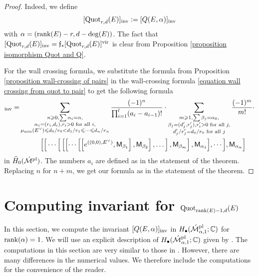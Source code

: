 \documentclass[11pt]{amsart}
\theoremstyle{remark}
\newcommand{\mf}[1]{\mathfrak{#1}}
\newcommand{\mb}[1]{\mathbb{#1}}
\newcommand{\Mdash}{\acute{\mathcal{M}}}
\newcommand{\rk}{\textnormal{rank}}
\newcommand{\wh}[1]{\widehat{#1}}
\newcommand{\quot}[0]{\textnormal{Quot}}
\newcommand{\vir}[0]{\textnormal{vir}}
\newcommand{\inv}[0]{\textnormal{inv}}
\newcommand{\pl}[0]{\textnormal{pl}}
\newcommand{\sfM}{\mathsf M}
\numberwithin{theorem}{section}
\begin{document}
    \begin{proof}
        Indeed, we define 
        $$[\quot_{r,d}(E)]_\inv := [Q(E,\alpha)]_\inv $$
        with $\alpha=(\rk(E)-r,d-\deg(E))$.
        The fact that $[\quot_{r,d}(E)]_\inv = \mf f_*[\quot_{r,d}(E)]^\vir$ 
        is clear from Proposition \ref{proposition isomorphism Quot and Q}.

        For the wall crossing formula, we substitute the formula from Proposition 
        \eqref{proposition wall-crossing of pairs} in the wall-crossing formula 
        \eqref{equation wall crossing from quot to pair} to get the following formula
    \begin{align*}
    [Q(E,\alpha)]_\inv =
           & \sum_{\substack{n \geqslant 0, \sum \alpha_i = \alpha, \\ 
                \alpha_i=(r_i,d_i), r_i>0 \text{ for all }i,\\
                \mu_{\min}(E^\vee) \leqslant d_0/r_0<d_1/r_1\leqslant\cdots\leqslant d_n/r_n}}
                \frac{(-1)^{n}}{\prod_{i=1}^l (a_i - a_{i-1})!} \cdot 
            \sum_{\substack{m \geqslant 1, \sum \beta_j = \alpha_0, \\ 
                \beta_j=(d'_j,r'_j), r'_i>0 \text{ for all }j,\\
                d'_j/r'_j=d_0/r_0 \text{ for all }j}}
                \frac{(-1)^{m}}{m!} \cdot \\
    \nonumber   & \qquad \quad
    \Big[ \Big[ \cdots \Big[
    \left[\left[ \cdots
    \left[ \left[e^{((0,0),E^\vee)},\sfM_{\beta_1} \right], \sfM_{\beta_2} \right],\dots \right],\sfM_{\beta_m}\right], \sfM_{\alpha_1} \Big],
    \cdots \Big], \sfM_{\alpha_n} \Big]
    \end{align*}
    in $\wh H_{0}(\Mdash^{\pl})$.
    The numbers $a_i$ are defined as in the statement of the theorem.
    Replacing $n$ for $n+m$, we get our formula as in the statement of the theorem.
    \end{proof}

\vspace{.3cm}

\section{Computing invariant for $\quot_{\rk(E)-1,d}(E)$}\label{section computing invariant}
In this section, we compute the invariant 
$[Q(E,\alpha)]_\inv$ in $H_\bullet(\Mdash_{\alpha,1}^\pl;\mb C)$ for $\rk(\alpha) =1$.
We will use an explicit description of $H_\bullet(\Mdash_{\alpha,1}^\pl;\mb C)$ given by \cite{gros20}.
The computations in this section are very similar to those in \cite[Theorem 4.3]{Bu23}. 
However, there are many differences in the numerical values.
We therefore include the computations for the convenience of the reader.
\end{document}
